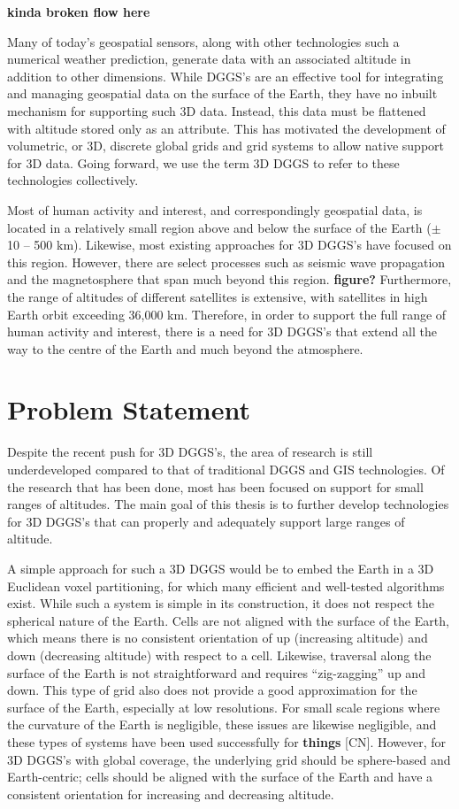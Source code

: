 \textbf{kinda broken flow here}

Many of today's geospatial sensors, along with other technologies such a numerical weather prediction, generate data with an associated altitude in addition to other dimensions.
While DGGS's are an effective tool for integrating and managing geospatial data on the surface of the Earth, they have no inbuilt mechanism for supporting such 3D data.
Instead, this data must be flattened with altitude stored only as an attribute.
This has motivated the development of volumetric, or 3D, discrete global grids and grid systems to allow native support for 3D data.
Going forward, we use the term 3D DGGS to refer to these technologies collectively.


Most of human activity and interest, and correspondingly geospatial data, is located in a relatively small region above and below the surface of the Earth ($\pm$10 -- 500 km).
Likewise, most existing approaches for 3D DGGS's have focused on this region.
However, there are select processes such as seismic wave propagation and the magnetosphere that span much beyond this region. \textbf{figure?}
Furthermore, the range of altitudes of different satellites is extensive, with satellites in high Earth orbit exceeding 36,000 km.
Therefore, in order to support the full range of human activity and interest, there is a need for 3D DGGS's that extend all the way to the centre of the Earth and much beyond the atmosphere.


\section{Problem Statement}
Despite the recent push for 3D DGGS's, the area of research is still underdeveloped compared to that of traditional DGGS and GIS technologies.
Of the research that has been done, most has been focused on support for small ranges of altitudes.
The main goal of this thesis is to further develop technologies for 3D DGGS's that can properly and adequately support large ranges of altitude. 

A simple approach for such a 3D DGGS would be to embed the Earth in a 3D Euclidean voxel partitioning, for which many efficient and well-tested algorithms exist.
While such a system is simple in its construction, it does not respect the spherical nature of the Earth.
Cells are not aligned with the surface of the Earth, which means there is no consistent orientation of up (increasing altitude) and down (decreasing altitude) with respect to a cell.
Likewise, traversal along the surface of the Earth is not straightforward and requires ``zig-zagging'' up and down.
This type of grid also does not provide a good approximation for the surface of the Earth, especially at low resolutions.
For small scale regions where the curvature of the Earth is negligible, these issues are likewise negligible, and these types of systems have been used successfully for \textbf{things} [CN].
However, for 3D DGGS's with global coverage, the underlying grid should be sphere-based and Earth-centric; cells should be aligned with the surface of the Earth and have a consistent orientation for increasing and decreasing altitude. 

